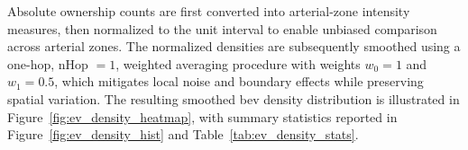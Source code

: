 Absolute ownership counts are first converted into arterial-zone intensity measures, then normalized to the unit interval to enable unbiased comparison across arterial zones. The normalized densities are subsequently smoothed using a one-hop, \gls{nHop} $=1 $, weighted averaging procedure with weights $w_{0}=1$ and $w_{1}=0.5$, which mitigates local noise and boundary effects while preserving spatial variation. The resulting smoothed \gls{bev} density distribution is illustrated in Figure~\ref{fig:ev_density_heatmap}, with summary statistics reported in Figure~\ref{fig:ev_density_hist} and Table~\ref{tab:ev_density_stats}.

